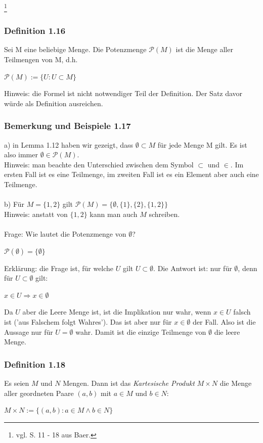 \documentclass{article}
\begin{document}
\date{Mittwoch, 25.10.23} \footnote{vgl. S. 11 - 18 aus Baer.}

\subsubsection*{Definition 1.16}
Sei M eine beliebige Menge. Die Potenzmenge $\mathcal{P}(M)$ ist die Menge aller Teilmengen von M, d.h.
\begin{center}
    $\mathcal{P}(M) := \{U: U \subset M\}$
\end{center}
Hinweis: die Formel ist nicht notwendiger Teil der Definition. Der Satz davor würde als Definition ausreichen.

\subsubsection*{Bemerkung und Beispiele 1.17}
a) in Lemma 1.12 haben wir gezeigt, dass $\emptyset \subset M$ für jede Menge M gilt. Es ist also immer $\emptyset \in \mathcal{P}(M)$. \\
Hinweis: man beachte den Unterschied zwischen dem Symbol $\subset$ und $\in$. Im ersten Fall ist es eine Teilmenge, im zweiten Fall ist es ein Element aber auch eine Teilmenge. \\
\\
b) Für $M = \{1, 2\}$ gilt $\mathcal{P}(M) = \{\emptyset, \{1\}, \{2\}, \{1, 2\}\}$ \\
Hinweis: anstatt von $\{1, 2\}$ kann man auch $M$ schreiben. \\
\\
Frage: Wie lautet die Potenzmenge von $\emptyset$? \\
\begin{center}
    $\mathcal{P}(\emptyset) = \{\emptyset\}$
\end{center}
Erklärung: die Frage ist, für welche $U$ gilt $U \subset \emptyset$. Die Antwort ist: nur für $\emptyset$, denn für $U \subset \emptyset$ gilt: \\
\begin{center}
    $x \in U \Rightarrow x \in \emptyset$ 
\end{center}
Da $U$ aber die Leere Menge ist, ist die Implikation nur wahr, wenn $x \in U$ falsch ist ('aus Falschem folgt Wahres'). Das ist aber nur für $x \in \emptyset$ der Fall. Also ist die Aussage nur für $U = \emptyset$ wahr. Damit ist die einzige Teilmenge von $\emptyset$ die leere Menge. \\

\subsubsection*{Definition 1.18}
Es seien $M$ und $N$ Mengen. Dann ist das \textit{Kartesische Produkt} $M \times N$ die Menge aller geordneten Paare $(a, b)$ mit $a \in M$ und $b \in N$:
\begin{center}
    $M \times N := \{(a, b): a \in M \wedge b \in N\}$
\end{center}
\end{document}
